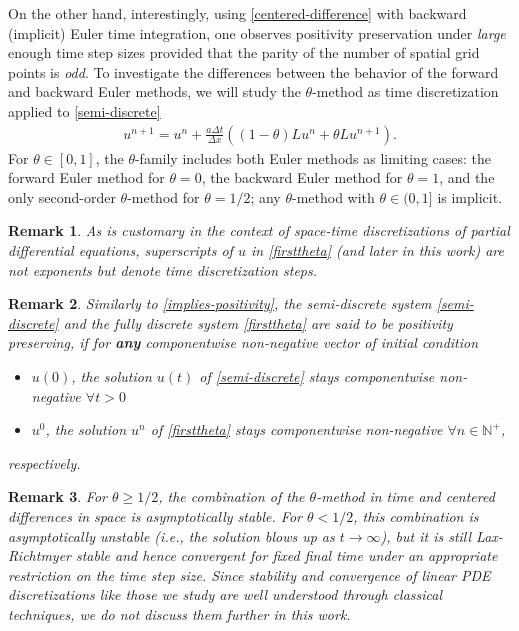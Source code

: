 \documentclass[smallextended,numbook,runningheads]{svjour3}     %
\newtheorem{remark}{Remark}
\newtheorem{remark}{Remark}
\newcommand{\dt}{\Delta t}
\newcommand{\dx}{\Delta x}
\newcommand{\te}{\theta}
\begin{document}
On the other hand, interestingly, using \eqref{centered-difference} with backward (implicit) 
Euler time integration, one observes positivity preservation
under \emph{large} enough time step sizes provided that the parity of the number of spatial grid points is \emph{odd}.  To investigate the differences between the behavior
of the forward and backward Euler methods, we will study the $\theta$-method 
\cite[Chapter IV.3]{hairerwanner} as time discretization applied to \eqref{semi-discrete}
\begin{align}\label{firsttheta}
    u^{n+1} = u^n + \frac{a\dt}{\dx}((1-\theta)Lu^n + \theta Lu^{n+1}).
\end{align}
For $\te\in[0,1]$, the $\theta$-family includes both Euler methods as limiting cases: the forward Euler method for $\te=0$, the backward 
 Euler method for $\te=1$, and the only second-order $\te$-method for $\te=1/2$; 
 any $\theta$-method with $\theta\in(0,1]$ is implicit.
 \begin{remark}
As is customary in the context of space-time discretizations of partial differential equations, superscripts of $u$ in \eqref{firsttheta} (and later in this work) are not exponents but denote time discretization steps.
\end{remark}
\begin{remark}
Similarly to \eqref{implies-positivity}, the semi-discrete system \eqref{semi-discrete} and the fully discrete system \eqref{firsttheta} are said to be \emph{positivity preserving}, if for \textbf{any} componentwise non-negative vector of initial condition 
\begin{itemize}
\item $u(0)$, the solution $u(t)$ of \eqref{semi-discrete} stays componentwise non-negative $\forall t>0$
\item $u^0$, the solution $u^n$ of \eqref{firsttheta} stays componentwise non-negative $\forall n\in\mathbb{N}^+$,
\end{itemize}
respectively.
\end{remark}
\begin{remark}
For $\theta\ge1/2$, the combination of the $\theta$-method in time and
centered differences in space is asymptotically stable.  For $\theta<1/2$,
this combination is asymptotically unstable (i.e., the solution blows up
as $t\to\infty$), but it is still Lax-Richtmyer stable and hence convergent
for fixed final time under an appropriate restriction on the time step size.
Since stability and convergence of linear PDE discretizations like those
we study are well understood through classical techniques, we do not discuss
them further in this work.
\end{remark}
\end{document}
